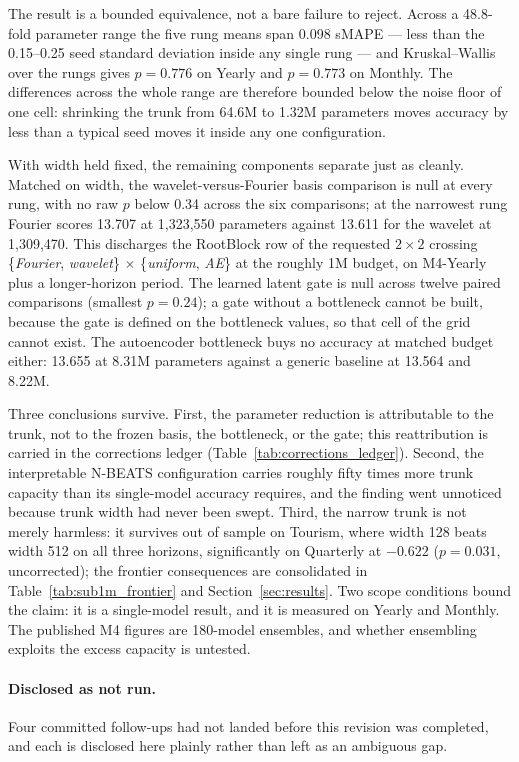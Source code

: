 The result is a bounded equivalence, not a bare failure to reject. Across
a 48.8-fold parameter range the five rung means span 0.098 sMAPE --- less
than the 0.15--0.25 seed standard deviation inside any single rung --- and
Kruskal--Wallis over the rungs gives $p = 0.776$ on Yearly and $p = 0.773$
on Monthly. The differences across the whole range are therefore bounded
below the noise floor of one cell: shrinking the trunk from 64.6M to
1.32M parameters moves accuracy by less than a typical seed moves it
inside any one configuration.

With width held fixed, the remaining components separate just as cleanly.
Matched on width, the wavelet-versus-Fourier basis comparison is null at
every rung, with no raw $p$ below 0.34 across the six comparisons; at the
narrowest rung Fourier scores 13.707 at 1{,}323{,}550 parameters against
13.611 for the wavelet at 1{,}309{,}470. This discharges the RootBlock row
of the requested $2\times2$ crossing \{\emph{Fourier}, \emph{wavelet}\}
$\times$ \{\emph{uniform}, \emph{AE}\} at the roughly 1M budget, on
M4-Yearly plus a longer-horizon period. The learned latent gate is null
across twelve paired comparisons (smallest $p = 0.24$); a gate without a
bottleneck cannot be built, because the gate is defined on the bottleneck
values, so that cell of the grid cannot exist. The autoencoder bottleneck
buys no accuracy at matched budget either: 13.655 at 8.31M parameters
against a generic baseline at 13.564 and 8.22M.

Three conclusions survive. First, the parameter reduction is attributable
to the trunk, not to the frozen basis, the bottleneck, or the gate; this
reattribution is carried in the corrections ledger
(Table~\ref{tab:corrections_ledger}). Second, the interpretable N-BEATS
configuration carries roughly fifty times more trunk capacity than its
single-model accuracy requires, and the finding went unnoticed because
trunk width had never been swept. Third, the narrow trunk is not merely
harmless: it survives out of sample on Tourism, where width 128 beats
width 512 on all three horizons, significantly on Quarterly at $-0.622$
($p = 0.031$, uncorrected); the frontier consequences are consolidated in
Table~\ref{tab:sub1m_frontier} and Section~\ref{sec:results}. Two scope
conditions bound the claim: it is a single-model result, and it is
measured on Yearly and Monthly. The published M4 figures are 180-model
ensembles, and whether ensembling exploits the excess capacity is
untested.

\paragraph{Disclosed as not run.}
Four committed follow-ups had not landed before this revision was
completed, and each is disclosed here plainly rather than left as an
ambiguous gap.

